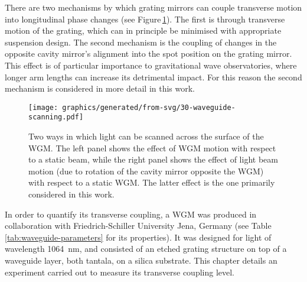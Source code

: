 There are two mechanisms by which grating mirrors can couple transverse motion into longitudinal phase changes (see Figure\,\ref{fig:waveguide-scanning}). The first is through transverse motion of the grating, which can in principle be minimised with appropriate suspension design. The second mechanism is the coupling of changes in the opposite cavity mirror's alignment into the spot position on the grating mirror. This effect is of particular importance to gravitational wave observatories, where longer arm lengths can increase its detrimental impact. For this reason the second mechanism is considered in more detail in this work.

\begin{figure}
  \centering
  \texttt{[image: graphics/generated/from-svg/30-waveguide-scanning.pdf]}
  \caption{\label{fig:waveguide-scanning}Two ways in which light can be scanned across the surface of the \gls{WGM}. The left panel shows the effect of \gls{WGM} motion with respect to a static beam, while the right panel shows the effect of light beam motion (due to rotation of the cavity mirror opposite the \gls{WGM}) with respect to a static \gls{WGM}. The latter effect is the one primarily considered in this work.}
\end{figure}

In order to quantify its transverse coupling, a \gls{WGM} was produced in collaboration with Friedrich-Schiller University Jena, Germany (see Table \ref{tab:waveguide-parameters} for its properties). It was designed for light of wavelength \SI{1064}{\nano\meter}, and consisted of an etched grating structure on top of a waveguide layer, both tantala, on a silica substrate. This chapter details an experiment carried out to measure its transverse coupling level.

